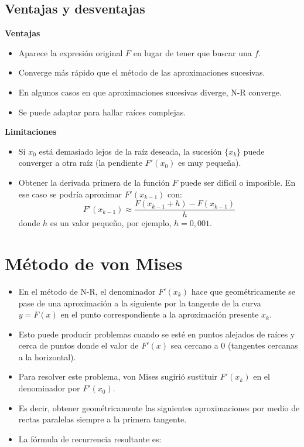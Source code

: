 \documentclass[openany]{book}
\providecommand{\tightlist}{%
  \setlength{\itemsep}{0pt}\setlength{\parskip}{0pt}}
\begin{document}
\hypertarget{ventajas-y-desventajas}{%
\subsection{Ventajas y desventajas}\label{ventajas-y-desventajas}}

\textbf{Ventajas}

\begin{itemize}
\tightlist
\item
  Aparece la expresión original \(F\) en lugar de tener que buscar una \(f\).
\item
  Converge más rápido que el método de las aproximaciones sucesivas.
\item
  En algunos casos en que aproximaciones sucesivas diverge, N-R converge.
\item
  Se puede adaptar para hallar raíces complejas.
\end{itemize}

\textbf{Limitaciones}

\begin{itemize}
\tightlist
\item
  Si \(x_0\) está demasiado lejos de la raíz deseada, la sucesión \(\{x_k\}\) puede converger a otra raíz (la pendiente \(F'(x_0)\) es muy pequeña).
\item
  Obtener la derivada primera de la función \(F\) puede ser difícil o imposible. En ese caso se podría aproximar \(F'(x_{k-1})\) con:
  \[F'(x_{k-1}) \approx \frac{F(x_{k-1} + h) - F(x_{k-1})}{h}\]
  donde \(h\) es un valor pequeño, por ejemplo, \(h = 0,001\).
\end{itemize}

\hypertarget{muxe9todo-de-von-mises}{%
\section{Método de von Mises}\label{muxe9todo-de-von-mises}}

\begin{itemize}
\tightlist
\item
  En el método de N-R, el denominador \(F'(x_k)\) hace que geométricamente se pase de una aproximación a la siguiente por la tangente de la curva \(y = F(x)\) en el punto correspondiente a la aproximación presente \(x_k\).
\item
  Esto puede producir problemas cuando se esté en puntos alejados de raíces y cerca de puntos donde el valor de \(F'(x)\) sea cercano a 0 (tangentes cercanas a la horizontal).
\item
  Para resolver este problema, von Mises sugirió sustituir \(F'(x_k)\) en el denominador por \(F'(x_0)\).
\item
  Es decir, obtener geométricamente las siguientes aproximaciones por medio de rectas paralelas siempre a la primera tangente.
\item
  La fórmula de recurrencia resultante es:
\end{itemize}
\end{document}
